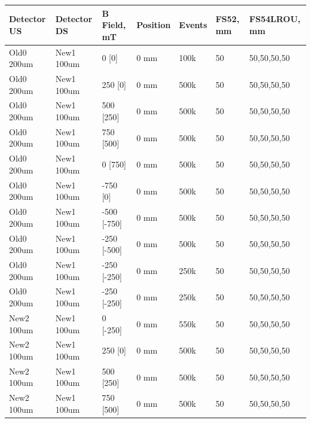 \begin{refsection}
        \begin{table}
        \centering
        \tiny
            \begin{tabular}{|l|l|l|l|l|l|l|}
            \hline
            Detector US & Detector DS & B Field, mT & Position & Events & FS52, mm & FS54LROU, mm \\ \hline
            Old0 200um  & New1 100um  & 0 {[}0{]}        & 0 mm     & 100k   & 50            & 50,50,50,50       \\ \hline
            Old0 200um  & New1 100um  & 250 {[}0{]}      & 0 mm     & 500k   & 50            & 50,50,50,50       \\ \hline
            Old0 200um  & New1 100um  & 500 {[}250{]}    & 0 mm     & 500k   & 50            & 50,50,50,50       \\ \hline
            Old0 200um  & New1 100um  & 750 {[}500{]}    & 0 mm     & 500k   & 50            & 50,50,50,50       \\ \hline
            Old0 200um  & New1 100um  & 0 {[}750{]}      & 0 mm     & 500k   & 50            & 50,50,50,50       \\ \hline
            Old0 200um  & New1 100um  & -750 {[}0{]}     & 0 mm     & 500k   & 50            & 50,50,50,50       \\ \hline
            Old0 200um  & New1 100um  & -500 {[}-750{]}  & 0 mm     & 500k   & 50            & 50,50,50,50       \\ \hline
            Old0 200um  & New1 100um  & -250 {[}-500{]}  & 0 mm     & 500k   & 50            & 50,50,50,50       \\ \hline
            Old0 200um  & New1 100um  & -250 {[}-250{]}  & 0 mm     & 250k   & 50            & 50,50,50,50       \\ \hline
            Old0 200um  & New1 100um  & -250 {[}-250{]}  & 0 mm     & 250k   & 50            & 50,50,50,50       \\ \hline
            New2 100um  & New1 100um  & 0 {[}-250{]}     & 0 mm     & 550k   & 50            & 50,50,50,50       \\ \hline
            New2 100um  & New1 100um  & 250 {[}0{]}      & 0 mm     & 500k   & 50            & 50,50,50,50       \\ \hline
            New2 100um  & New1 100um  & 500 {[}250{]}    & 0 mm     & 500k   & 50            & 50,50,50,50       \\ \hline
            New2 100um  & New1 100um  & 750 {[}500{]}    & 0 mm     & 500k   & 50            & 50,50,50,50       \\ \hline

\end{tabular}
\end{table}
\end{refsection}
